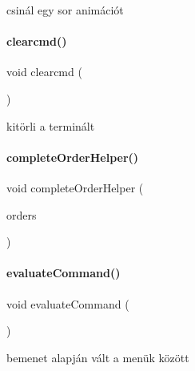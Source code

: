 csinál egy sor animációt 

\mbox{\label{_menu_8h_aaa6e5fc0d7c515998e48fe6ae944ca40}} 
\paragraph{\texorpdfstring{clearcmd()}{clearcmd()}}
{\footnotesize\ttfamily void clearcmd (\begin{DoxyParamCaption}{ }\end{DoxyParamCaption})\hspace{0.3cm}{\ttfamily [inline]}}



kitörli a terminált 

\mbox{\label{_menu_8h_a0f808ec53d26f8bcef1a0f22783c78f8}} 
\paragraph{\texorpdfstring{completeOrderHelper()}{completeOrderHelper()}}
{\footnotesize\ttfamily void complete\+Order\+Helper (\begin{DoxyParamCaption}\item[{\mbox{\hyperlink{class_orders}{Orders}} \&}]{orders }\end{DoxyParamCaption})}

\mbox{\label{_menu_8h_aed630b39565f9b935d3148b396fd862d}} 
\paragraph{\texorpdfstring{evaluateCommand()}{evaluateCommand()}}
{\footnotesize\ttfamily void evaluate\+Command (\begin{DoxyParamCaption}\item[{enum \mbox{\hyperlink{_menu_8h_adbc27074b7dcd54cd4578936c6329d02}{enum\+Menu}} \&}]{ }\end{DoxyParamCaption})}



bemenet alapján vált a menük között 

\mbox{\label{_menu_8h_a849fbf52d43e574e121662054591db87}} 
